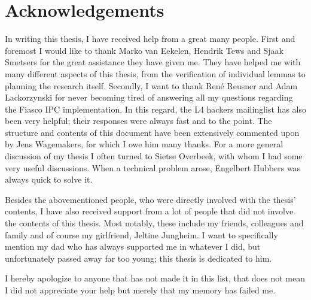 \chapter*{Acknowledgements}
In writing this thesis, I have received help from a great many people. First and foremost I would like to thank Marko van Eekelen, Hendrik Tews and Sjaak Smetsers for the great assistance they have given me. They have helped me with many different aspects of this thesis, from the verification of individual lemmas to planning the research itself. Secondly, I want to thank Ren{\'e} Reusner and Adam Lackorzynski for never becoming tired of answering all my questions regarding the Fiasco IPC implementation. In this regard, the L4 hackers mailinglist has also been very helpful; their responses were always fast and to the point. The structure and contents of this document have been extensively commented upon by Jens Wagemakers, for which I owe him many thanks. For a more general discussion of my thesis I often turned to Sietse Overbeek, with whom I had some very useful discussions. When a technical problem arose, Engelbert Hubbers was always quick to solve it.\emptyline

Besides the abovementioned people, who were directly involved with the thesis' contents, I have also received support from a lot of people that did not involve the contents of this thesis. Most notably, these include my friends, colleagues and family and of course my girlfriend, Jeltine Jungheim. I want to specifically mention my dad who has always supported me in whatever I did, but unfortunately passed away far too young; this thesis is dedicated to him.\emptyline

I hereby apologize to anyone that has not made it in this list, that does not mean I did not appreciate your help but merely that my memory has failed me.